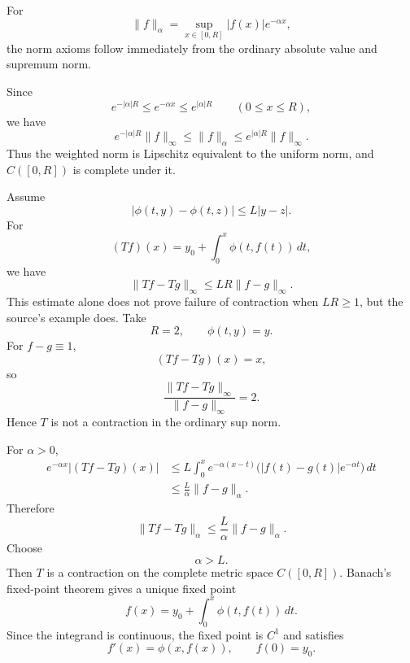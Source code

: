 \begin{solution}
For
\[
\|f\|_\alpha
=
\sup_{x\in[0,R]}
|f(x)|e^{-\alpha x},
\]
the norm axioms follow immediately from the ordinary absolute value and supremum norm.

Since
\[
e^{-|\alpha|R}
\le
e^{-\alpha x}
\le
e^{|\alpha|R}
\qquad(0\le x\le R),
\]
we have
\[
\boxed{
e^{-|\alpha|R}\|f\|_\infty
\le
\|f\|_\alpha
\le
e^{|\alpha|R}\|f\|_\infty.
}
\]
Thus the weighted norm is Lipschitz equivalent to the uniform norm, and \(C([0,R])\) is
complete under it.

Assume
\[
|\phi(t,y)-\phi(t,z)|
\le
L|y-z|.
\]
For
\[
(Tf)(x)
=
y_0+\int_0^x\phi(t,f(t))\,dt,
\]
we have
\[
\|Tf-Tg\|_\infty
\le
LR\|f-g\|_\infty.
\]
This estimate alone does not prove failure of contraction when \(LR\ge1\), but the source's
example does. Take
\[
R=2,
\qquad
\phi(t,y)=y.
\]
For \(f-g\equiv1\),
\[
(Tf-Tg)(x)=x,
\]
so
\[
\frac{\|Tf-Tg\|_\infty}{\|f-g\|_\infty}=2.
\]
Hence \(T\) is not a contraction in the ordinary sup norm.

For \(\alpha>0\),
\[
\begin{aligned}
e^{-\alpha x}|(Tf-Tg)(x)|
&\le
L\int_0^x
e^{-\alpha(x-t)}
\bigl(
|f(t)-g(t)|e^{-\alpha t}
\bigr)\,dt\\
&\le
\frac{L}{\alpha}
\|f-g\|_\alpha.
\end{aligned}
\]
Therefore
\[
\boxed{
\|Tf-Tg\|_\alpha
\le
\frac{L}{\alpha}\|f-g\|_\alpha.
}
\]
Choose
\[
\alpha>L.
\]
Then \(T\) is a contraction on the complete metric space \(C([0,R])\). Banach's fixed-point
theorem gives a unique fixed point
\[
f(x)
=
y_0+\int_0^x\phi(t,f(t))\,dt.
\]
Since the integrand is continuous, the fixed point is \(C^1\) and satisfies
\[
\boxed{
f'(x)=\phi(x,f(x)),
\qquad
f(0)=y_0.
}
\]
\end{solution}


